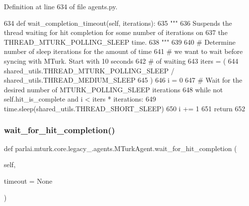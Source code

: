 Definition at line 634 of file agents.\+py.


\begin{DoxyCode}
634     \textcolor{keyword}{def }wait\_completion\_timeout(self, iterations):
635         \textcolor{stringliteral}{"""}
636 \textcolor{stringliteral}{        Suspends the thread waiting for hit completion for some number of iterations on}
637 \textcolor{stringliteral}{        the THREAD\_MTURK\_POLLING\_SLEEP time.}
638 \textcolor{stringliteral}{        """}
639 
640         \textcolor{comment}{# Determine number of sleep iterations for the amount of time}
641         \textcolor{comment}{# we want to wait before syncing with MTurk. Start with 10 seconds}
642         \textcolor{comment}{# of waiting}
643         iters = (
644             shared\_utils.THREAD\_MTURK\_POLLING\_SLEEP / shared\_utils.THREAD\_MEDIUM\_SLEEP
645         )
646         i = 0
647         \textcolor{comment}{# Wait for the desired number of MTURK\_POLLING\_SLEEP iterations}
648         \textcolor{keywordflow}{while} \textcolor{keywordflow}{not} self.hit\_is\_complete \textcolor{keywordflow}{and} i < iters * iterations:
649             time.sleep(shared\_utils.THREAD\_SHORT\_SLEEP)
650             i += 1
651         \textcolor{keywordflow}{return}
652 
\end{DoxyCode}
\mbox{\label{classparlai_1_1mturk_1_1core_1_1legacy__2018_1_1agents_1_1MTurkAgent_a89e1e1c284db9228d61afb3f93247b12}} 
\subsubsection{\texorpdfstring{wait\+\_\+for\+\_\+hit\+\_\+completion()}{wait\_for\_hit\_completion()}}
{\footnotesize\ttfamily def parlai.\+mturk.\+core.\+legacy\+\_.\+agents.\+M\+Turk\+Agent.\+wait\+\_\+for\+\_\+hit\+\_\+completion (\begin{DoxyParamCaption}\item[{}]{self,  }\item[{}]{timeout = {\ttfamily None} }\end{DoxyParamCaption})}

